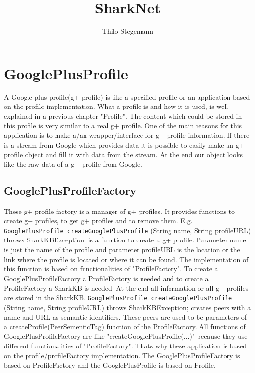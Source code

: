 \documentclass[12pt]{article}
\begin{document}
\title{SharkNet}
\maketitle
\author{Thilo Stegemann}
\section{GooglePlusProfile}
\label{sec:knowledgePorts:GooglePlusProfile}

A Google plus profile(g+ profile) is like a specified profile or an application based on the profile implementation. What a profile is and how it is used, is well explained in a previous chapter "Profile". The content which could be stored in this profile is very similar to a real g+ profile. One of the main reasons for this application is to make a/an wrapper/interface for g+ profile information. If there is a stream from Google which provides data it is possible to easily make an g+ profile object and fill it with data from the stream. At the end our object looks like the raw data of a g+ profile from Google. 

\subsection{GooglePlusProfileFactory}

These g+ profile factory is a manager of g+ profiles. It provides functions to create g+ profiles, to get g+ profiles and to remove them. E.g. {\tt GooglePlusProfile createGooglePlusProfile} (String name, String profileURL) throws SharkKBException; is a function to create a g+ profile. Parameter name is just the name of the profile and parameter profileURL is the location or the link where the profile is located or where it can be found. The implementation of this function is based on functionalities of "ProfileFactory". To create a GooglePlusProfileFactory a ProfileFactory is needed and to create a ProfileFactory a SharkKB is needed. At the end all information or all g+ profiles are stored in the SharkKB.  {\tt GooglePlusProfile createGooglePlusProfile} (String name, String profileURL) throws SharkKBException; creates peers with a name and URL as semantic identifiers. These peers are used to be parameters of a createProfile(PeerSementicTag) function of the ProfileFactory. All functions of GooglePlusProfileFactory are like "createGooglePlusProfile(...)" because they use different functionalities of "ProfileFactory". Thats why these application is based on the profile/profileFactory implementation. The GooglePlusProfileFactory is based on ProfileFactory and the GooglePlusProfile is based on Profile.
\end{document}
